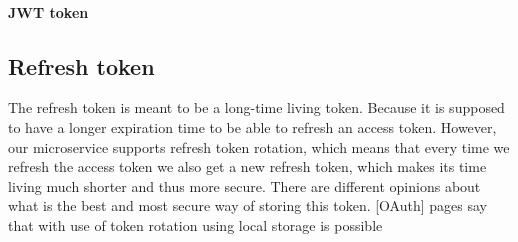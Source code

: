 \paragraph*{JWT token}

\subsection{Refresh token}
The refresh token is meant to be a long-time living token. Because it is supposed to have a longer expiration time to be able to refresh an access token.
However, our microservice supports refresh token rotation, which means that every time we refresh the access token we also get a new refresh token, which makes its time living much shorter and thus more secure. There are different opinions about what is the best and most secure way of storing this token. [OAuth] pages say that with use of token rotation using local storage is possible
